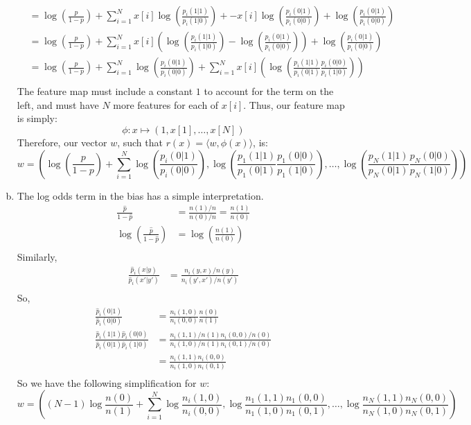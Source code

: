 \documentclass{amsart}
\theoremstyle{definition}
\begin{document}
\begin{enumerate}[(a)]
\begin{align*}
			&= \log\left(\frac{p}{1-p}\right) + \sum_{i=1}^{N}x[i]\log\left(\frac{p_i(1|1)}{p_i(1|0)}\right) + -x[i]\log\left(\frac{p_i(0|1)}{p_i(0|0)}\right) + \log\left(\frac{p_i(0|1)}{p_i(0|0)}\right) \\
			&= \log\left(\frac{p}{1-p}\right) + \sum_{i=1}^{N}x[i]\left(\log\left(\frac{p_i(1|1)}{p_i(1|0)}\right) -\log\left(\frac{p_i(0|1)}{p_i(0|0)}\right)\right) + \log\left(\frac{p_i(0|1)}{p_i(0|0)}\right)\\
			&= \log\left(\frac{p}{1-p}\right) + \sum_{i=1}^{N}\log\left(\frac{p_i(0|1)}{p_i(0|0)}\right) + \sum_{i=1}^{N}x[i]\left(\log\left(\frac{p_i(1|1)}{p_i(0|1)}\frac{p_i(0|0)}{p_i(1|0)}\right)\right)\\
		\end{align*}
		The feature map must include a constant $1$ to account for the term on the left, and must have $N$ more features for each of $x[i]$. Thus, our feature map is simply:
		\[\phi: x \mapsto (1, x[1], \ldots, x[N])\]
		Therefore, our vector $w$, such that $r(x) = \langle w, \phi(x)\rangle$, is:
		\[w = \left(\log\left(\frac{p}{1-p}\right) + \sum_{i=1}^{N}\log\left(\frac{p_i(0|1)}{p_i(0|0)}\right), \log\left(\frac{p_1(1|1)}{p_1(0|1)}\frac{p_1(0|0)}{p_1(1|0)}\right), \ldots, \log\left(\frac{p_N(1|1)}{p_N(0|1)}\frac{p_N(0|0)}{p_N(1|0)}\right)\right)\]
	\item 
		The log odds term in the bias has a simple interpretation. 
		\begin{align*}
			\frac{\hat{p}}{1-\hat{p}} &= \frac{n(1)/n}{n(0)/n} = \frac{n(1)}{n(0)}\\
			\log\left(\frac{\hat{p}}{1-\hat{p}}\right) &= \log\left(\frac{n(1)}{n(0)}\right)\\
		\end{align*}
		Similarly, 
		\begin{align*}
			\frac{\hat{p}_i(x|y)}{\hat{p}_i(x'|y')} &= \frac{n_i(y, x)/n(y)}{n_i(y',x')/n(y')}\\
		\end{align*}
		So, 
		\begin{align*}
			\frac{\hat{p}_i(0|1)}{\hat{p}_i(0|0)} &= \frac{n_i(1, 0)}{n_i(0, 0)}\frac{n(0)}{n(1)}\\
			\frac{\hat{p}_i(1|1)\hat{p}_i(0|0)}{\hat{p}_i(0|1)\hat{p}_i(1|0)} &= \frac{n_i(1, 1)/n(1) n_i(0, 0)/n(0)}{n_i(1, 0)/n(1) n_i(0, 1)/n(0)}\\
			&= \frac{n_i(1,1)n_i(0,0)}{n_i(1,0)n_i(0,1)}\\
		\end{align*}
		So we have the following simplification for $w$:
		\[w = \left((N-1)\log\frac{n(0)}{n(1)} + \sum_{i = 1}^{N} \log \frac{n_i(1, 0)}{n_i(0,0)}, \log \frac{n_1(1,1)n_1(0,0)}{n_1(1,0)n_1(0,1)}, \ldots, \log \frac{n_N(1,1)n_N(0,0)}{n_N(1,0)n_N(0,1)}\right)\]
\end{enumerate}
\end{document}

